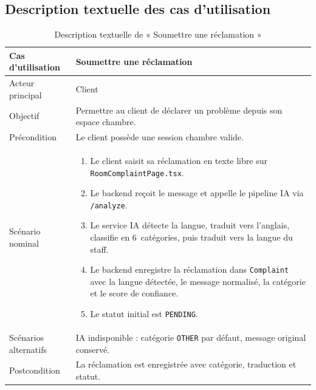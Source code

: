 \subsection{Description textuelle des cas d'utilisation}

\begin{table}[H]
\centering
\caption{Description textuelle de « Soumettre une réclamation »}
\small
\begin{tabularx}{\textwidth}{|p{3.5cm}|X|}
\hline
Cas d'utilisation & Soumettre une réclamation \\ \hline
Acteur principal & Client \\ \hline
Objectif & Permettre au client de déclarer un problème depuis son espace chambre. \\ \hline
Précondition & Le client possède une session chambre valide. \\ \hline
Scénario nominal &
\begin{enumerate}[nosep]
\item Le client saisit sa réclamation en texte libre sur \texttt{RoomComplaintPage.tsx}.
\item Le backend reçoit le message et appelle le pipeline IA via \texttt{/analyze}.
\item Le service IA détecte la langue, traduit vers l'anglais, classifie en 6~catégories, puis traduit vers la langue du staff.
\item Le backend enregistre la réclamation dans \texttt{Complaint} avec la langue détectée, le message normalisé, la catégorie et le score de confiance.
\item Le statut initial est \texttt{PENDING}.
\end{enumerate} \\ \hline
Scénarios alternatifs & IA indisponible : catégorie \texttt{OTHER} par défaut, message original conservé. \\ \hline
Postcondition & La réclamation est enregistrée avec catégorie, traduction et statut. \\ \hline
\end{tabularx}
\end{table}

